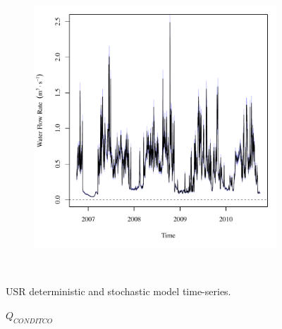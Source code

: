 \begin{linenumbers}
\begin{landscape}
\begin{figure}
\begin{subfigure}{0.7\textwidth}
		\end{subfigure}%
		\begin{subfigure}{0.7\textwidth}
			\centering
			\includegraphics[width=\textwidth]{"Figures/Results_USR/Stochastic/Q CAN"}
		\end{subfigure}\\
		\caption{USR deterministic and stochastic model time-series.}
	\end{figure}
\end{landscape}
\subfiguremid
\begin{landscape}
	\begin{figure}
		\centering
		$ Q_{CONDITCO} $
		\begin{subfigure}{0.7\textwidth}
			\centering

\end{subfigure}
\end{figure}
\end{landscape}
\end{linenumbers}
